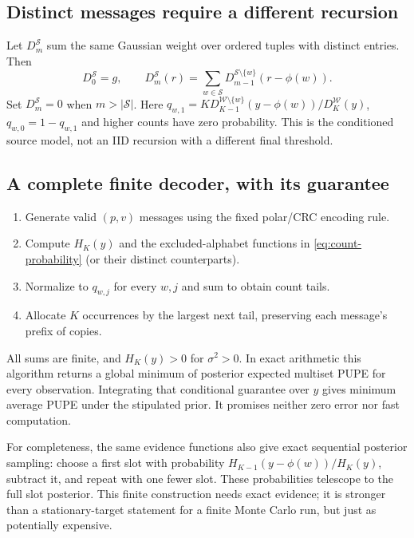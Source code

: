 \documentclass[10pt,a4paper]{article}
\newcommand{\calW}{\mathcal W}
\begin{document}
\subsection{Distinct messages require a different recursion}
Let $D_m^{\mathcal S}$ sum the same Gaussian weight over ordered tuples with distinct entries. Then
\begin{equation}
 D_0^{\mathcal S}=g,\qquad
 D_m^{\mathcal S}(r)=\sum_{w\in\mathcal S}
 D_{m-1}^{\mathcal S\setminus\{w\}}(r-\phi(w)).
 \label{eq:distinct-recursion}
\end{equation}
Set $D_m^{\mathcal S}=0$ when $m>|\mathcal S|$. Here
$q_{w,1}=K D_{K-1}^{\calW\setminus\{w\}}(y-\phi(w))/D_K^{\calW}(y)$,
$q_{w,0}=1-q_{w,1}$ and higher counts have zero probability.
This is the conditioned source model, not an IID recursion with a different final threshold.

\subsection{A complete finite decoder, with its guarantee}
\begin{enumerate}
\item Generate valid $(p,v)$ messages using the fixed polar/CRC encoding rule.
\item Compute $H_K(y)$ and the excluded-alphabet functions in \eqref{eq:count-probability}
      (or their distinct counterparts).
\item Normalize to $q_{w,j}$ for every $w,j$ and sum to obtain count tails.
\item Allocate $K$ occurrences by the largest next tail, preserving each message's prefix of copies.
\end{enumerate}
All sums are finite, and $H_K(y)>0$ for $\sigma^2>0$. In exact arithmetic this algorithm returns a global
minimum of posterior expected multiset PUPE for every observation. Integrating that conditional guarantee over
$y$ gives minimum average PUPE under the stipulated prior. It promises neither zero error nor fast computation.

For completeness, the same evidence functions also give exact sequential posterior sampling:
choose a first slot with probability $H_{K-1}(y-\phi(w))/H_K(y)$, subtract it, and repeat with one fewer slot.
These probabilities telescope to the full slot posterior. This finite construction needs exact evidence;
it is stronger than a stationary-target statement for a finite Monte Carlo run, but just as potentially expensive.
\end{document}
